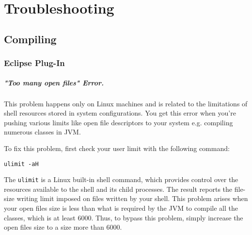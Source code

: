 
\chapter{Troubleshooting}
\section{Compiling}
\subsection{Eclipse Plug-In}
\paragraph{"Too many open files" Error.} This problem happens only on Linux
machines and is related to the limitations of shell resources stored in system configurations. You get this error when you're pushing various limits like open file descriptors to your system e.g. compiling numerous classes in JVM.

To fix this problem, first check your user limit with the following command:
\begin{verbatim}
ulimit -aH
\end{verbatim}
The \texttt{ulimit} is a Linux built-in shell command, which provides control over the resources available to the shell and its child processes. The result reports the file-size  writing limit imposed on files written by your shell. This problem arises when your open files size is less than what is required by the JVM to compile all the classes, which is at least 6000. Thus, to bypass this problem, simply increase the open files size to a size more than 6000.

